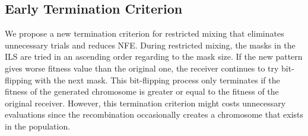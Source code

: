 \documentclass{sig-alternate-05-2015}
\begin{document}
\subsection{Early Termination Criterion}

We propose a new termination criterion for restricted mixing that eliminates unnecessary trials and reduces NFE. During restricted mixing, the masks in the ILS are tried in an ascending order regarding to the mask size. If the new pattern gives worse fitness value than the original one, the receiver continues to try bit-flipping with the next  mask. This bit-flipping process only terminates if the fitness of the generated chromosome is greater or equal to the fitness of the original receiver. However, this termination criterion might costs unnecessary evaluations since the recombination occasionally creates a chromosome that exists in the population. 
\end{document}
